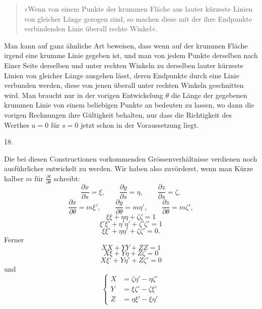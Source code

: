 %
\begin{quote}
»Wenn von einem Punkte der krummen Fläche aus lauter kürzeste Linien von gleicher Länge gezogen sind, so machen diese mit der ihre Endpunkte verbindenden Linie überall rechte Winkel«.
\end{quote}
\noindent\hspace*{1.2em}Man kann auf ganz ähnliche Art beweisen, dass wenn auf der krummen Fläche irgend eine krumme Linie gegeben ist, und man von jedem Punkte derselben nach Einer Seite derselben und unter rechten Winkeln zu derselben lauter kürzeste Linien von gleicher Länge ausgehen lässt, deren Endpunkte durch eine Linie verbunden werden, diese von jenen überall unter rechten Winkeln geschnitten wird. Man braucht nur in der vorigen Entwickelung $\theta$ die Länge der gegebenen krummen Linie von einem beliebigen Punkte an bedeuten zu lassen, wo dann die vorigen Rechnungen ihre Gültigkeit behalten, nur dass die Richtigkeit des Werthes $u=0$ für $s=0$ jetzt schon in der Voraussetzung liegt.

\begin{center}18.\end{center}
\noindent\hspace*{1.2em}Die bei diesen Constructionen vorkommenden Grössenverhältnisse verdienen noch ausführlicher entwickelt zu werden. Wir haben also zuvörderst, wenn man Kürze halber $m$ für $\frac{\partial t}{\partial\theta}$ schreibt:
\begin{equation}
\frac{\partial x}{\partial s}=\xi,\qquad\frac{\partial y}{\partial s}=\eta,\qquad\frac{\partial z}{\partial s}=\zeta,\tag{1}
\end{equation}
\begin{equation}
\frac{\partial x}{\partial\theta}=m\xi',\qquad\frac{\partial y}{\partial\theta}=m\eta',\qquad\frac{\partial z}{\partial\theta}=m\zeta',\tag{2}
\end{equation}
\begin{equation}\xi\xi+\eta\eta+\zeta\zeta=1\tag{3}\end{equation}
\begin{equation}\xi'\xi'+\eta'\eta'+\zeta'\zeta'=1\tag{4}\end{equation}
\begin{equation}\xi\xi'+\eta\eta'+\zeta\zeta'=0.\tag{5}\end{equation}
Ferner
\begin{equation}XX+YY+ZZ=1\tag{6}\end{equation}
\begin{equation}X\xi+Y\eta+Z\zeta=0\tag{7}\end{equation}
\begin{equation}X\xi'+Y\eta'+Z\zeta'=0\tag{8}\end{equation}
und
\begin{equation}
\left\{\begin{aligned}X&=\zeta\eta'-\eta\zeta'\\Y&=\xi\zeta'-\zeta\xi'\\Z&=\eta\xi'-\xi\eta'\end{aligned}\right.\tag*{[9]}
\end{equation}
